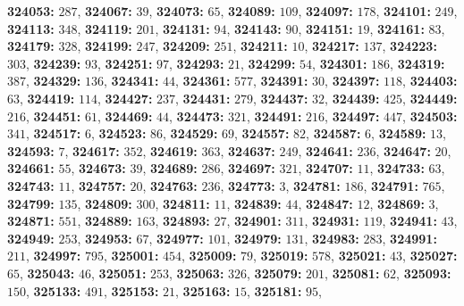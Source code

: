 \textsf{\bfseries 324053:} $287$, \textsf{\bfseries 324067:} $39$, \textsf{\bfseries 324073:} $65$, \textsf{\bfseries 324089:} $109$, \textsf{\bfseries 324097:} $178$, \textsf{\bfseries 324101:} $249$, \textsf{\bfseries 324113:} $348$, \textsf{\bfseries 324119:} $201$, \textsf{\bfseries 324131:} $94$, \textsf{\bfseries 324143:} $90$, \textsf{\bfseries 324151:} $19$, \textsf{\bfseries 324161:} $83$, \textsf{\bfseries 324179:} $328$, \textsf{\bfseries 324199:} $247$, \textsf{\bfseries 324209:} $251$, \textsf{\bfseries 324211:} $10$, \textsf{\bfseries 324217:} $137$, \textsf{\bfseries 324223:} $303$, \textsf{\bfseries 324239:} $93$, \textsf{\bfseries 324251:} $97$, \textsf{\bfseries 324293:} $21$, \textsf{\bfseries 324299:} $54$, \textsf{\bfseries 324301:} $186$, \textsf{\bfseries 324319:} $387$, \textsf{\bfseries 324329:} $136$, \textsf{\bfseries 324341:} $44$, \textsf{\bfseries 324361:} $577$, \textsf{\bfseries 324391:} $30$, \textsf{\bfseries 324397:} $118$, \textsf{\bfseries 324403:} $63$, \textsf{\bfseries 324419:} $114$, \textsf{\bfseries 324427:} $237$, \textsf{\bfseries 324431:} $279$, \textsf{\bfseries 324437:} $32$, \textsf{\bfseries 324439:} $425$, \textsf{\bfseries 324449:} $216$, \textsf{\bfseries 324451:} $61$, \textsf{\bfseries 324469:} $44$, \textsf{\bfseries 324473:} $321$, \textsf{\bfseries 324491:} $216$, \textsf{\bfseries 324497:} $447$, \textsf{\bfseries 324503:} $341$, \textsf{\bfseries 324517:} $6$, \textsf{\bfseries 324523:} $86$, \textsf{\bfseries 324529:} $69$, \textsf{\bfseries 324557:} $82$, \textsf{\bfseries 324587:} $6$, \textsf{\bfseries 324589:} $13$, \textsf{\bfseries 324593:} $7$, \textsf{\bfseries 324617:} $352$, \textsf{\bfseries 324619:} $363$, \textsf{\bfseries 324637:} $249$, \textsf{\bfseries 324641:} $236$, \textsf{\bfseries 324647:} $20$, \textsf{\bfseries 324661:} $55$, \textsf{\bfseries 324673:} $39$, \textsf{\bfseries 324689:} $286$, \textsf{\bfseries 324697:} $321$, \textsf{\bfseries 324707:} $11$, \textsf{\bfseries 324733:} $63$, \textsf{\bfseries 324743:} $11$, \textsf{\bfseries 324757:} $20$, \textsf{\bfseries 324763:} $236$, \textsf{\bfseries 324773:} $3$, \textsf{\bfseries 324781:} $186$, \textsf{\bfseries 324791:} $765$, \textsf{\bfseries 324799:} $135$, \textsf{\bfseries 324809:} $300$, \textsf{\bfseries 324811:} $11$, \textsf{\bfseries 324839:} $44$, \textsf{\bfseries 324847:} $12$, \textsf{\bfseries 324869:} $3$, \textsf{\bfseries 324871:} $551$, \textsf{\bfseries 324889:} $163$, \textsf{\bfseries 324893:} $27$, \textsf{\bfseries 324901:} $311$, \textsf{\bfseries 324931:} $119$, \textsf{\bfseries 324941:} $43$, \textsf{\bfseries 324949:} $253$, \textsf{\bfseries 324953:} $67$, \textsf{\bfseries 324977:} $101$, \textsf{\bfseries 324979:} $131$, \textsf{\bfseries 324983:} $283$, \textsf{\bfseries 324991:} $211$, \textsf{\bfseries 324997:} $795$, \textsf{\bfseries 325001:} $454$, \textsf{\bfseries 325009:} $79$, \textsf{\bfseries 325019:} $578$, \textsf{\bfseries 325021:} $43$, \textsf{\bfseries 325027:} $65$, \textsf{\bfseries 325043:} $46$, \textsf{\bfseries 325051:} $253$, \textsf{\bfseries 325063:} $326$, \textsf{\bfseries 325079:} $201$, \textsf{\bfseries 325081:} $62$, \textsf{\bfseries 325093:} $150$, \textsf{\bfseries 325133:} $491$, \textsf{\bfseries 325153:} $21$, \textsf{\bfseries 325163:} $15$, \textsf{\bfseries 325181:} $95$, 
